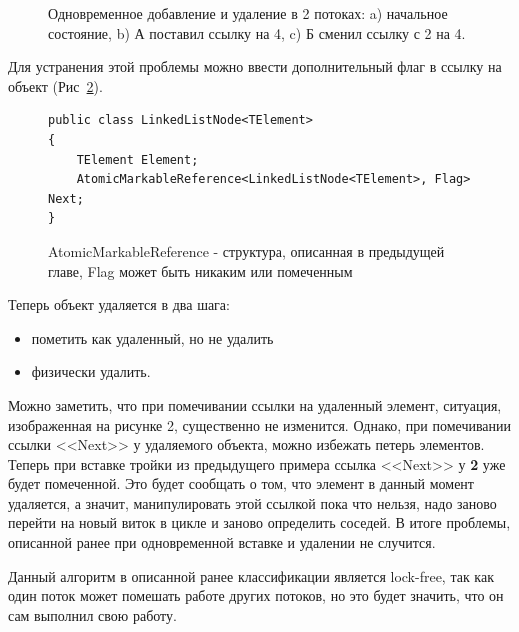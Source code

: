 \documentclass[12pt]{article}
\begin{document}
{\begin{figure}[h!]
\begin{minipage}[h]{0.45\linewidth}
{							\label{pic:insertDeleteC}
						}
					\end{minipage}
					\caption{Одновременное добавление и удаление в 2 потоках: a) начальное состояние, b) А поставил ссылку на 4, c) Б сменил ссылку с 2 на 4.}
				\end{figure}
				\par Для устранения этой проблемы можно ввести дополнительный флаг в ссылку на объект (Рис~\ref{pic:listAMR}).
				\begin{figure}[h]
					\begin{lstlisting}
public class LinkedListNode<TElement>
{
	TElement Element;
	AtomicMarkableReference<LinkedListNode<TElement>, Flag> Next;
}
					\end{lstlisting}
					\caption{AtomicMarkableReference - структура, описанная в предыдущей главе, Flag может быть никаким или помеченным}
					\label{pic:listAMR}
				\end{figure}
				\par Теперь объект удаляется в два шага: 
				\begin{itemize}
					\item пометить как удаленный, но не удалить
					\item физически удалить. 
				\end{itemize}
				Можно заметить, что при помечивании ссылки на удаленный элемент, ситуация, изображенная на рисунке 2, существенно не изменится. Однако, при помечивании ссылки <<Next>> у удаляемого объекта, можно избежать петерь элементов. Теперь при вставке тройки из предыдущего примера ссылка <<Next>> у \textbf{2} уже будет помеченной. Это будет сообщать о том, что элемент в данный момент удаляется, а значит, манипулировать этой ссылкой пока что нельзя, надо заново перейти на новый виток в цикле и заново определить соседей. В итоге проблемы, описанной ранее при одновременной вставке и удалении не случится.
				\par Данный алгоритм в описанной ранее классификации является lock-free, так как один поток может помешать работе других потоков, но это будет значить, что он сам выполнил свою работу.
}
\end{document}
